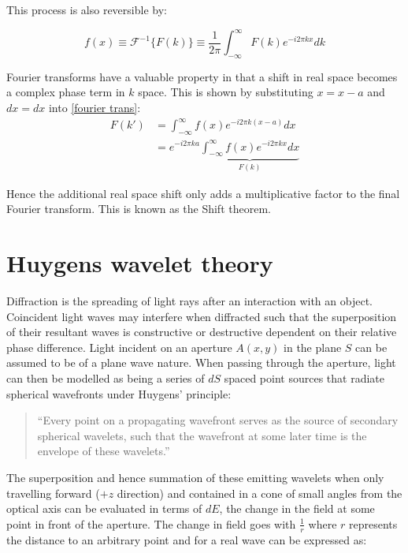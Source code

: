 This process is also reversible by:

\begin{equation}
f(x) \equiv\mathcal{F}^{-1}  \{F(k)\} \equiv \frac{1}{2 \pi} \int_{-\infty}^{\infty}F(k) e^{-i2 \pi kx} dk
\end{equation}


Fourier transforms have a valuable property in that a shift in real space becomes a complex phase term in $k$ space. This is shown by substituting $x = x-a$ and $dx = dx$ into \eqref{fourier trans}:
\begin{align}
F(k') &=  \int_{-\infty}^{\infty}f(x) e^{-i2 \pi k(x-a)} dx \nonumber\\
&=  e^{-i2 \pi ka} \underbrace{\int_{-\infty}^{\infty}f(x) e^{-i2 \pi kx}dx}_{F(k)}   \label{shift_ivariance}
\end{align}

Hence the additional real space shift only adds a multiplicative factor to the final Fourier transform. This is known as the Shift theorem.

\section{Huygens wavelet theory}

Diffraction is the spreading of light rays after an interaction with an object. Coincident light waves may interfere when diffracted such that the superposition of their resultant waves is constructive or destructive dependent on their relative phase difference. Light incident on an aperture $A(x,y)$ in the plane $S$ can be assumed to be of a plane wave nature. When passing through the aperture, light can then be modelled as being a series of $dS$ spaced point sources that radiate spherical wavefronts under Huygens' principle:

\begin{quote}
``Every point on a propagating wavefront serves as the source of secondary spherical wavelets, such that the wavefront at some later time is the envelope of these wavelets.''~\cite{goodmanIntroductionFourierOptics1996}
\end{quote}

%

The superposition and hence summation of these emitting wavelets when only travelling forward ($+z$ direction) and contained in a cone of small angles from the optical axis can be evaluated in terms of $dE$, the change in the field at some point in front of the aperture. The change in field goes with $\frac{1}{r}$ where $r$ represents the distance to an arbitrary point and for a real wave can be expressed as:


